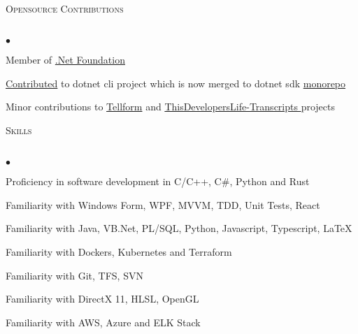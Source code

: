 \documentclass{article}
\newcommand{\lineunder}{\vspace*{-8pt} \\ \hspace*{-18pt} \hrulefill \\}
\newcommand{\header}[1]{{\hspace*{-15pt}\vspace*{6pt} \textsc{#1}} \vspace*{-6pt} \lineunder}
\newenvironment{achievements}{\begin{list}{$\bullet$}{\topsep 0pt \itemsep -2pt}}{\vspace*{4pt}\end{list}}
\begin{document}
\header{Opensource Contributions}
\begin{achievements}
\item
  Member of \href{https://dotnetfoundation.org/}{.Net Foundation}
\item
  \href{https://github.com/dotnet/cli/pull/10914}{Contributed} to dotnet cli project which is now merged to dotnet sdk \href{https://github.com/dotnet/sdk}{monorepo}
\item
  Minor contributions to \href{https://github.com/tellform/tellform}{Tellform} and \href{https://github.com/shanselman/ThisDevelopersLife-Transcripts/pull/36}{ThisDevelopersLife-Transcripts
} projects
\end{achievements}

\header{Skills}
\begin{achievements}
\item Proficiency in software development in C/C++, C\#, Python and Rust
\item Familiarity with Windows Form, WPF, MVVM, TDD, Unit Tests, React
\item Familiarity with Java, VB.Net, PL/SQL, Python, Javascript, Typescript, \LaTeX
\item Familiarity with Dockers, Kubernetes and Terraform
\item Familiarity with Git, TFS, SVN 
\item Familiarity with DirectX 11, HLSL, OpenGL 
\item Familiarity with AWS, Azure and ELK Stack
\end{achievements}
\end{document}
